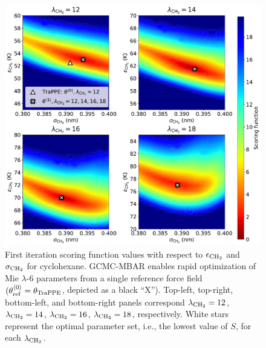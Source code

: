 \documentclass[journal=jced,manuscript=article]{achemso}
\begin{document}
	\begin{figure}[htb!]
		\centering
		\includegraphics[width=6.4in]{CYC6_scoring_function_lam.pdf}
		\caption{First iteration scoring function values with respect to $\epsilon_{\rm CH_2}$ and $\sigma_{\rm CH_2}$ for cyclohexane. GCMC-MBAR enables rapid optimization of Mie $\lambda$-6 parameters from a single reference force field $(\theta^{\langle0\rangle}_{\rm ref} = \theta_{\rm TraPPE}$, depicted as a black ``X''). Top-left, top-right, bottom-left, and bottom-right panels correspond $\lambda_{\rm CH_2} = 12$, $\lambda_{\rm CH_2} = 14$, $\lambda_{\rm CH_2} = 16$, $\lambda_{\rm CH_2} = 18$, respectively. White stars represent the optimal parameter set, i.e., the lowest value of $S$, for each $\lambda_{\rm CH_2}$.} %
		\label{fig:Score_CYC6}
	\end{figure} 
\end{document}
